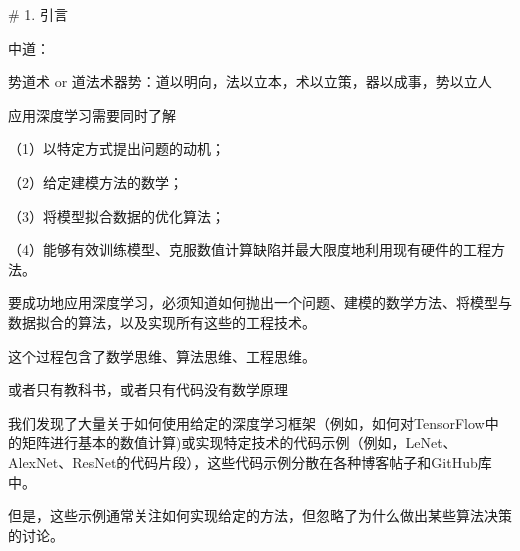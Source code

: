 # 1. 引言

中道：



势道术 or 道法术器势：道以明向，法以立本，术以立策，器以成事，势以立人





应用深度学习需要同时了解

（1）以特定方式提出问题的动机；

（2）给定建模方法的数学；

（3）将模型拟合数据的优化算法；

（4）能够有效训练模型、克服数值计算缺陷并最大限度地利用现有硬件的工程方法。

要成功地应用深度学习，必须知道如何抛出一个问题、建模的数学方法、将模型与数据拟合的算法，以及实现所有这些的工程技术。

这个过程包含了数学思维、算法思维、工程思维。



或者只有教科书，或者只有代码没有数学原理

我们发现了大量关于如何使用给定的深度学习框架（例如，如何对TensorFlow中的矩阵进行基本的数值计算)或实现特定技术的代码示例（例如，LeNet、AlexNet、ResNet的代码片段），这些代码示例分散在各种博客帖子和GitHub库中。

但是，这些示例通常关注如何实现给定的方法，但忽略了为什么做出某些算法决策的讨论。

